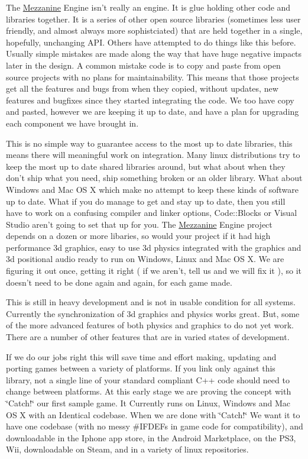 The \hyperlink{namespaceMezzanine}{Mezzanine} Engine isn't really an engine. It is glue holding other code and libraries together. It is a series of other open source libraries (sometimes less user friendly, and almost always more sophistciated) that are held together in a single, hopefully, unchanging API. Others have attempted to do things like this before. Usually simple mistakes are made along the way that have huge negative impacts later in the design. A common mistake code is to copy and paste from open source projects with no plans for maintainability. This means that those projects get all the features and bugs from when they copied, without updates, new features and bugfixes since they started integrating the code. We too have copy and pasted, however we are keeping it up to date, and have a plan for upgrading each component we have brought in.

This is no simple way to guarantee access to the most up to date libraries, this means there will meaningful work on integration. Many linux distributions try to keep the most up to date shared libraries around, but what about when they don't ship what you need, ship something broken or an older library. What about Windows and Mac OS X which make no attempt to keep these kinds of software up to date. What if you do manage to get and stay up to date, then you still have to work on a confusing compiler and linker options, Code::Blocks or Visual Studio aren't going to set that up for you. The \hyperlink{namespaceMezzanine}{Mezzanine} Engine project depends on a dozen or more libaries, so would your project if it had high performance 3d graphics, easy to use 3d physics integrated with the graphics and 3d positional audio ready to run on Windows, Linux and Mac OS X. We are figuring it out once, getting it right ( if we aren't, tell us and we will fix it ), so it doesn't need to be done again and again, for each game made.

This is still in heavy development and is not in usable condition for all systems. Currently the synchronization of 3d graphics and physics works great. But, some of the more advanced features of both physics and graphics to do not yet work. There are a number of other features that are in varied states of development.

If we do our jobs right this will save time and effort making, updating and porting games between a variety of platforms. If you link only against this library, not a single line of your standard compliant C++ code should need to change between platforms. At this early stage we are proving the concept with \char`\"{}Catch!\char`\"{} our first sample game. It Currently runs on Linux, Windows and Mac OS X with an Identical codebase. When we are done with \char`\"{}Catch!\char`\"{} We want it to have one codebase (with no messy \#IFDEFs in game code for compatibility), and downloadable in the Iphone app store, in the Android Marketplace, on the PS3, Wii, downloadable on Steam, and in a variety of linux repositories.

